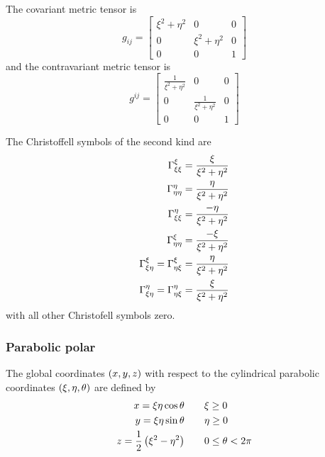 The covariant metric tensor is
\begin{equation}
  g_{ij}=\begin{bmatrix}
    \xi^{2}+\eta^{2} & 0 & 0 \\
    0 & \xi^{2}+\eta^{2} & 0 \\
    0 & 0 & 1
  \end{bmatrix}
\end{equation}
and the contravariant metric tensor is
\begin{equation}
  g^{ij}=\begin{bmatrix}
    \frac{1}{\xi^{2}+\eta^{2}}& 0 & 0 \\
    0 & \frac{1}{\xi^{2}+\eta^{2}} & 0 \\
    0 & 0 & 1
  \end{bmatrix}
\end{equation}

The Christoffell symbols of the second kind are
\begin{align}
   \Gamma^{\xi}_{\xi\xi} &=\frac{\xi}{\xi^{2}+\eta^{2}} \\
   \Gamma^{\eta}_{\eta\eta} &=\frac{\eta}{\xi^{2}+\eta^{2}} \\
   \Gamma^{\eta}_{\xi\xi} &=\frac{-\eta}{\xi^{2}+\eta^{2}} \\
   \Gamma^{\xi}_{\eta\eta} &=\frac{-\xi}{\xi^{2}+\eta^{2}} \\
   \Gamma^{\xi}_{\xi\eta} = \Gamma^{\xi}_{\eta\xi} &=\frac{\eta}{\xi^{2}+\eta^{2}} \\
   \Gamma^{\eta}_{\xi\eta} = \Gamma^{\eta}_{\eta\xi} &=\frac{\xi}{\xi^{2}+\eta^{2}} \\
\end{align}
with all other Christofell symbols zero.

\subsubsection{Parabolic polar}

The global coordinates $\left( x,y,z \right)$ with respect to the cylindrical parabolic
coordinates $\left( \xi,\eta,\theta \right)$  are defined by
\begin{equation}
  \begin{aligned}
    x = \xi\eta\cos\theta & \qquad \xi \ge 0 \\
    y = \xi\eta\sin\theta & \qquad \eta \ge 0 \\
    z = \frac{1}{2}\left( \xi^{2}-\eta^{2} \right) & \qquad 0 \le \theta < 2\pi
  \end{aligned}
\end{equation}

